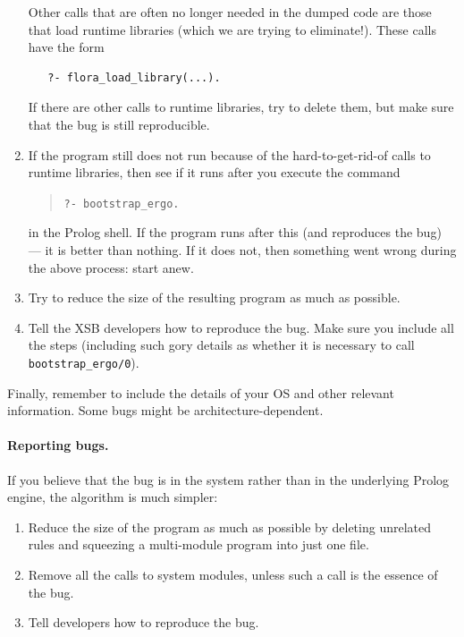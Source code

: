 \documentclass[11pt]{article}
\newcommand{\ERGO}{\mbox{\smaller{\ensuremath{\cal{E}}\smaller{{\sc{RGO}}}}}\xspace}
\newcommand{\FLSYSTEM}{\ERGO}
\newcommand{\FLBOOTSTRAP}{bootstrap\_ergo}
\begin{document}
\begin{enumerate}
    Other calls that are often no longer needed in the dumped code are
    those that load \FLSYSTEM runtime libraries (which we are trying to
    eliminate!). These calls have the form
    \begin{verbatim}
   ?- flora_load_library(...).      
    \end{verbatim}
    If there are other calls to \FLSYSTEM runtime libraries, try to delete
    them, but make sure that the bug is still reproducible.
  \item If the program still does not run because of the hard-to-get-rid-of
    calls to \FLSYSTEM runtime libraries, then see if it runs after you
    execute the command
    \begin{quote}
       {\tt ?- \FLBOOTSTRAP.}      
    \end{quote}
    in the Prolog shell. If the program runs after this (and reproduces the
    bug) --- it is better than nothing. If it does not, then something went
    wrong during the above process: start anew.
  \item Try to reduce the size of the resulting program as much as possible.
  \item Tell the XSB developers how to reproduce the bug. Make sure you
    include all the steps (including such gory details as whether it is
    necessary to call {\tt \FLBOOTSTRAP/0}).
\end{enumerate}
Finally, remember to include the details of your OS and other relevant
information. Some bugs might be architecture-dependent.

\paragraph{Reporting \FLSYSTEM bugs.}
If you believe that the bug is in the \FLSYSTEM system rather than in the
underlying Prolog engine, the algorithm is much simpler: 
\begin{enumerate}
  \item Reduce the size of the program as much as possible by deleting 
    unrelated rules and squeezing a multi-module program into
    just one file.
  \item Remove all the calls to system modules, unless such a call is
    the essence of the bug.
  \item Tell \FLSYSTEM developers how to reproduce the bug.
\end{enumerate}
\end{document}
